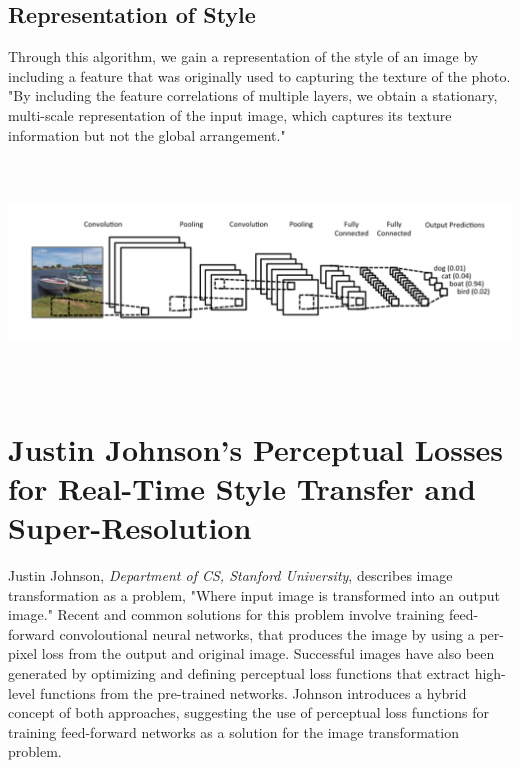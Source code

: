\documentclass[12pt]{article}
\begin{document}
\subsection{Representation of Style}
Through this algorithm, we gain a representation of the style of an image
by including a feature that was originally used to capturing the texture of the photo. 
"By including the feature correlations of multiple layers, we obtain a stationary, multi-scale representation of the input
image, which captures its texture information but not the global arrangement." \cite{Gatys}

\begin{center}
    \includegraphics[height=60mm, width=160mm]{visuals/cnn.png}
\end{center}


\section{Justin Johnson's Perceptual Losses for Real-Time Style Transfer and Super-Resolution}
Justin Johnson, \textit{Department of CS, Stanford University}, describes image transformation as a problem, "Where input image is transformed into an output image." \cite{Johnson} Recent and common solutions for this problem involve training feed-forward convoloutional neural networks, that produces the image by using a per-pixel loss from the output and original image. Successful images have also been generated by optimizing and defining perceptual loss functions that extract high-level functions from the pre-trained networks. Johnson introduces a hybrid concept of both approaches, suggesting the use of perceptual loss functions for training feed-forward networks as a solution for the image transformation problem. 
\end{document}
